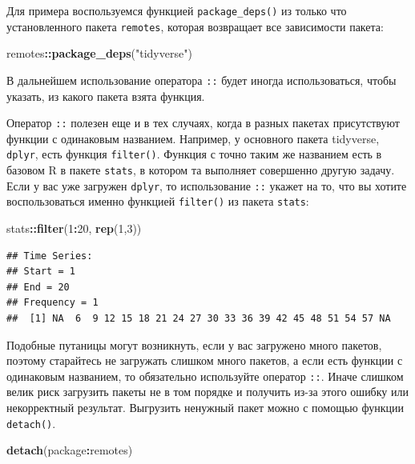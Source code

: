 \documentclass[]{book}
\newenvironment{Shaded}{\begin{snugshade}}{\end{snugshade}}
\newcommand{\KeywordTok}[1]{\textcolor[rgb]{0.13,0.29,0.53}{\textbf{#1}}}
\newcommand{\DecValTok}[1]{\textcolor[rgb]{0.00,0.00,0.81}{#1}}
\newcommand{\StringTok}[1]{\textcolor[rgb]{0.31,0.60,0.02}{#1}}
\newcommand{\OperatorTok}[1]{\textcolor[rgb]{0.81,0.36,0.00}{\textbf{#1}}}
\newcommand{\NormalTok}[1]{#1}
\begin{document}
Для примера воспользуемся функцией \texttt{package\_deps()} из только
что установленного пакета \texttt{remotes}, которая возвращает все
зависимости пакета:

\begin{Shaded}
\begin{Highlighting}[]
\NormalTok{remotes}\OperatorTok{::}\KeywordTok{package_deps}\NormalTok{(}\StringTok{"tidyverse"}\NormalTok{)}
\end{Highlighting}
\end{Shaded}

В дальнейшем использование оператора \texttt{::} будет иногда
использоваться, чтобы указать, из какого пакета взята функция.

Оператор \texttt{::} полезен еще и в тех случаях, когда в разных пакетах
присутствуют функции с одинаковым названием. Например, у основного
пакета tidyverse, \texttt{dplyr}, есть функция \texttt{filter()}.
Функция с точно таким же названием есть в базовом R в пакете
\texttt{stats}, в котором та выполняет совершенно другую задачу. Если у
вас уже загружен \texttt{dplyr}, то использование \texttt{::} укажет на
то, что вы хотите воспользоваться именно функцией \texttt{filter()} из
пакета \texttt{stats}:

\begin{Shaded}
\begin{Highlighting}[]
\NormalTok{stats}\OperatorTok{::}\KeywordTok{filter}\NormalTok{(}\DecValTok{1}\OperatorTok{:}\DecValTok{20}\NormalTok{, }\KeywordTok{rep}\NormalTok{(}\DecValTok{1}\NormalTok{,}\DecValTok{3}\NormalTok{))}
\end{Highlighting}
\end{Shaded}

\begin{verbatim}
## Time Series:
## Start = 1 
## End = 20 
## Frequency = 1 
##  [1] NA  6  9 12 15 18 21 24 27 30 33 36 39 42 45 48 51 54 57 NA
\end{verbatim}

Подобные путаницы могут возникнуть, если у вас загружено много пакетов,
поэтому старайтесь не загружать слишком много пакетов, а если есть
функции с одинаковым названием, то обязательно используйте оператор
\texttt{::}. Иначе слишком велик риск загрузить пакеты не в том порядке
и получить из-за этого ошибку или некорректный результат. Выгрузить
ненужный пакет можно с помощью функции \texttt{detach()}.

\begin{Shaded}
\begin{Highlighting}[]
\KeywordTok{detach}\NormalTok{(package}\OperatorTok{:}\NormalTok{remotes)}
\end{Highlighting}
\end{Shaded}
\end{document}
